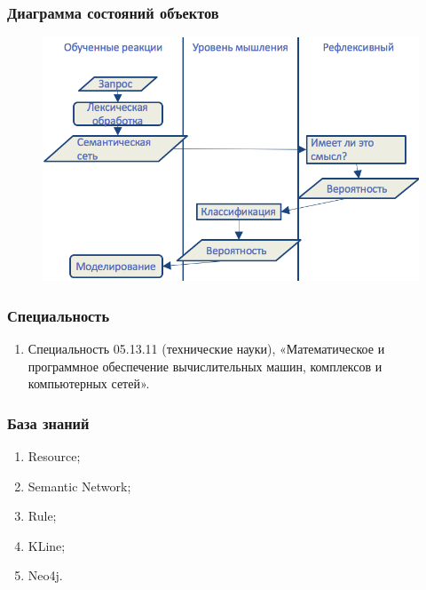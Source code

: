 \documentclass[14pt]{beamer}
\begin{document}
\begin{frame}
\frametitle{Диаграмма состояний объектов}
\begin{figure} [h] 
  \center
  \includegraphics [scale=0.35] {ObjectState}
  \label{img:ObjectState}  
\end{figure}
\end{frame}


\begin{frame}
\frametitle{Специальность}
\begin{enumerate}
    \item Специальность 05.13.11 (технические науки), «Математическое и программное обеспечение вычислительных машин, комплексов и компьютерных сетей».
\end{enumerate}
\end{frame}

\begin{frame}
\frametitle{База знаний}
\begin{enumerate}
	\item Resource;
	\item Semantic Network;
	\item Rule;
	\item KLine;
	\item Neo4j.
\end{enumerate}
\end{frame}
\end{document}
